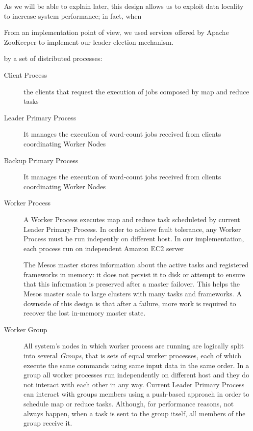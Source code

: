 \documentclass[sigchi]{acmart}
\begin{document}
As we will be able to explain later, this design allows us to exploit data locality to increase system performance; in fact, when 


From an implementation point of view, we used services offered by Apache ZooKeeper to implement our leader election mechanism.


















 by a set of distributed processes:

\begin{description}
\item[Client Process] the clients that request the execution of jobs composed by map and reduce tasks

\item[Leader Primary Process] It manages the execution of word-count jobs received from clients coordinating Worker Nodes 

\item[Backup Primary Process] It manages the execution of word-count jobs received from clients coordinating Worker Nodes 

\item[Worker Process] A Worker Process executes map and reduce task scheduleted by current Leader Primary Process. In order to achieve fault tolerance, any Worker Process must be run indepently on different host. In our implementation, each process run on independent Amazon EC2 server

The Mesos master stores information about the active tasks and registered frameworks in memory: it does not persist it to disk or attempt to ensure that this information is preserved after a master failover. This helps the Mesos master scale to large clusters with many tasks and frameworks. A downside of this design is that after a failure, more work is required to recover the lost in-memory master state.



\item[Worker Group] All system's nodes in which worker process are running are logically split into several \textit{Groups}, that is sets of equal worker processes, each of which execute the same commands using same input data in the same order. In a group all worker processes run independently on different host and they do not interact with each other in any way. Current Leader Primary Process can interact with groups members using a push-based approach in order to schedule map or reduce tasks. Although, for performance reasons, not always happen, when a task is sent to the group itself, all members of the group receive it.




\end{description}
\end{document}

